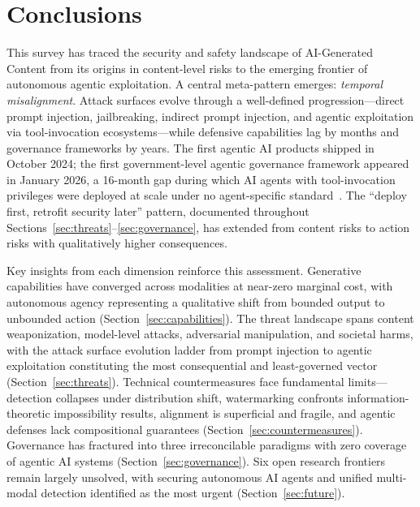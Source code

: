 
\section{Conclusions}
\label{sec:conclusions}

This survey has traced the security and safety landscape of AI-Generated Content from its origins in content-level risks to the emerging frontier of autonomous agentic exploitation. A central meta-pattern emerges: \emph{temporal misalignment}. Attack surfaces evolve through a well-defined progression---direct prompt injection, jailbreaking, indirect prompt injection, and agentic exploitation via tool-invocation ecosystems---while defensive capabilities lag by months and governance frameworks by years. The first agentic AI products shipped in October 2024; the first government-level agentic governance framework appeared in January 2026, a 16-month gap during which AI agents with tool-invocation privileges were deployed at scale under no agent-specific standard~\cite{imda2026agentic}. The ``deploy first, retrofit security later'' pattern, documented throughout Sections~\ref{sec:threats}--\ref{sec:governance}, has extended from content risks to action risks with qualitatively higher consequences.

Key insights from each dimension reinforce this assessment. Generative capabilities have converged across modalities at near-zero marginal cost, with autonomous agency representing a qualitative shift from bounded output to unbounded action (Section~\ref{sec:capabilities}). The threat landscape spans content weaponization, model-level attacks, adversarial manipulation, and societal harms, with the attack surface evolution ladder from prompt injection to agentic exploitation constituting the most consequential and least-governed vector (Section~\ref{sec:threats}). Technical countermeasures face fundamental limits---detection collapses under distribution shift, watermarking confronts information-theoretic impossibility results, alignment is superficial and fragile, and agentic defenses lack compositional guarantees (Section~\ref{sec:countermeasures}). Governance has fractured into three irreconcilable paradigms with zero coverage of agentic AI systems (Section~\ref{sec:governance}). Six open research frontiers remain largely unsolved, with securing autonomous AI agents and unified multi-modal detection identified as the most urgent (Section~\ref{sec:future}).

